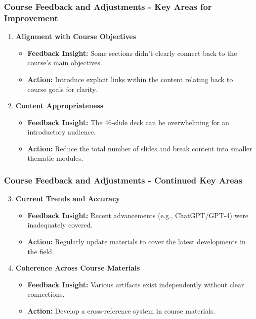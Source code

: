 \documentclass[aspectratio=169]{beamer}
\begin{document}
\begin{frame}[fragile]
    \frametitle{Course Feedback and Adjustments - Key Areas for Improvement}
    \begin{enumerate}
        \item \textbf{Alignment with Course Objectives}
            \begin{itemize}
                \item \textbf{Feedback Insight:} Some sections didn’t clearly connect back to the course’s main objectives.
                \item \textbf{Action:} Introduce explicit links within the content relating back to course goals for clarity.
            \end{itemize}
        
        \item \textbf{Content Appropriateness}
            \begin{itemize}
                \item \textbf{Feedback Insight:} The 46-slide deck can be overwhelming for an introductory audience.
                \item \textbf{Action:} Reduce the total number of slides and break content into smaller thematic modules.
            \end{itemize}
    \end{enumerate}
\end{frame}

\begin{frame}[fragile]
    \frametitle{Course Feedback and Adjustments - Continued Key Areas}
    \begin{enumerate}
        \setcounter{enumi}{2}
        \item \textbf{Current Trends and Accuracy}
            \begin{itemize}
                \item \textbf{Feedback Insight:} Recent advancements (e.g., ChatGPT/GPT-4) were inadequately covered.
                \item \textbf{Action:} Regularly update materials to cover the latest developments in the field.
            \end{itemize}
        
        \item \textbf{Coherence Across Course Materials}
            \begin{itemize}
                \item \textbf{Feedback Insight:} Various artifacts exist independently without clear connections.
                \item \textbf{Action:} Develop a cross-reference system in course materials.
            \end{itemize}
    \end{enumerate}
\end{frame}
\end{document}
